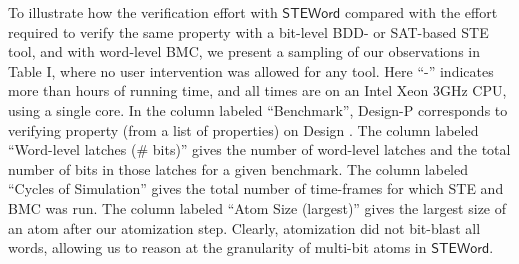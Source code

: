 \documentclass{llncs}
\newcommand{\steword}{\ensuremath{\mathsf{STEWord}}}
\begin{document}
To illustrate how the verification effort with {\steword} compared
with the effort required to verify the same property with a bit-level
BDD- or SAT-based STE tool, and with word-level BMC, we present a
sampling of our observations in Table I, where no user intervention
was allowed for any tool.  Here ``-'' indicates more than  hours
of running time, and all times are on an Intel Xeon 3GHz CPU, using
a single core.  In the column labeled ``Benchmark'',
Design-P corresponds to verifying property  (from a list of
properties) on Design .  The column labeled ``Word-level latches
(\# bits)'' gives the number of word-level latches and the total
number of bits in those latches for a given benchmark.  The column
labeled ``Cycles of Simulation'' gives the total number of time-frames
for which STE and BMC was run.  The column labeled ``Atom Size
(largest)'' gives the largest size of an atom after our atomization
step.  Clearly, atomization did not bit-blast all words,
allowing us to reason at the granularity of multi-bit atoms in {\steword}.
\end{document}

